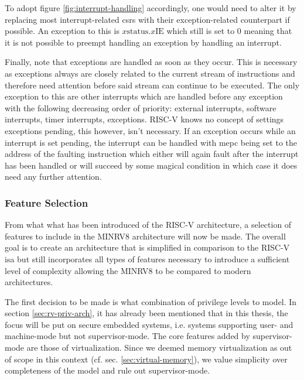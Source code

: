 To adopt figure \ref{fig:interrupt-handling} accordingly, one would need to alter it by replacing most interrupt-related \glspl{csr} with their exception-related counterpart if possible.
An exception to this is $ x\text{status}.x\text{IE} $ which still is set to 0 meaning that it is not possible to preempt handling an exception by handling an interrupt.

Finally, note that exceptions are handled as soon as they occur.
This is necessary as exceptions always are closely related to the current stream of instructions and therefore need attention before said stream can continue to be executed.
The only exception to this are other interrupts which are handled before any exception with the following decreasing order of priority: external interrupts, software interrupts, timer interrupts, exceptions.
RISC-V knows no concept of settings exceptions pending, this however, isn't necessary.
If an exception occurs while an interrupt is set pending, the interrupt can be handled with \gls{mepc} being set to the address of the faulting instruction which either will again fault after the interrupt has been handled or will succeed by some magical condition in which case it does need any further attention.

\subsubsection{Feature Selection}
\label{sec:risc-v-selection}

From what what has been introduced of the RISC-V architecture, a selection of features to include in the MINRV8 architecture will now be made.
The overall goal is to create an architecture that is simplified in comparison to the RISC-V \gls{isa} but still incorporates all types of features necessary to introduce a sufficient level of complexity allowing the MINRV8 to be compared to modern architectures.

The first decision to be made is what combination of privilege levels to model.
In section \ref{sec:rv-priv-arch}, it has already been mentioned that in this thesis, the focus will be put on secure embedded systems, i.e. systems supporting user- and machine-mode but not supervisor-mode.
The core features added by supervisor-mode are those of virtualization.
Since we deemed memory virtualization as out of scope in this context (cf. sec. \ref{sec:virtual-memory}), we value simplicity over completeness of the model and rule out supervisor-mode.

